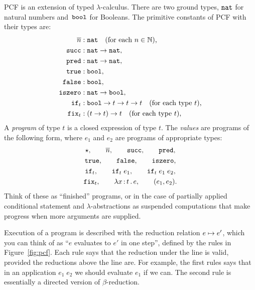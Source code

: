 PCF is an extension of typed $\lambda$-calculus. There are two ground
types, $\mathtt{nat}$ for natural numbers and~$\mathtt{bool}$ for Booleans. The
primitive constants of PCF with their types are:
%
\begin{align*}
  \overline{n} &: \mathtt{nat} \quad \text{(for each $n \in \mathbb{N}$),} \\
  \mathtt{succ} &: \mathtt{nat} \to \mathtt{nat}, \\
  \mathtt{pred} &: \mathtt{nat} \to \mathtt{nat}, \\
  \mathtt{true} &: \mathtt{bool}, \\
  \mathtt{false} &: \mathtt{bool}, \\
  \mathtt{iszero} &: \mathtt{nat} \to \mathtt{bool}, \\
  \mathtt{if}_t &: \mathtt{bool} \to t \to t \to t \quad\text{(for each type $t$),}\\
  \mathtt{fix}_t &: (t \to t) \to t \quad\text{(for each type $t$),}
\end{align*}
%
A \emph{program} of type $t$ is a closed expression of type $t$. The
\emph{values} are programs of the following form, where $e_1$ and
$e_2$ are programs of appropriate types:
%
\begin{gather*}
  \star,\qquad \overline{n},\qquad \mathtt{succ},\qquad \mathtt{pred},\\
  \mathtt{true},\qquad \mathtt{false},\qquad \mathtt{iszero},\\
  \mathtt{if}_t,\qquad \mathtt{if}_t \; e_1,\qquad \mathtt{if}_t \; e_1\; e_2,\\
  \mathtt{fix}_t,\qquad \lambda x \,{:}\, t\,.\,e,\qquad (e_1, e_2).
\end{gather*}
%
Think of these as ``finished'' programs, or in the case of partially
applied conditional statement and $\lambda$-abstractions as suspended
computations that make progress when more arguments are supplied.

Execution of a program is described with the reduction relation $e
\mapsto e'$, which you can think of as ``$e$ evaluates to $e'$ in one
step'', defined by the rules in Figure~\ref{fig:pcf}. Each rule says
that the reduction under the line is valid, provided the reductions
above the line are. For example, the first rules says that in an
application $e_1\;e_2$ we should evaluate $e_1$ if we can. The second
rule is essentially a directed version of $\beta$-reduction.

